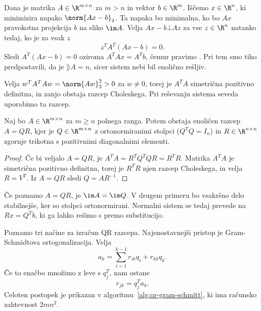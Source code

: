 

Dana je matrika $A \in \R^{m \times n}$ za $m > n$ in vektor $b \in \R^m$.
Iščemo $x \in \R^n$, ki minimizira napako $\norm{Ax-b}_2$.
Ta napaka bo minimalna, ko bo $Ax$ pravokotna projekcija $b$ na sliko $\im A$.
Velja $Ax - b \bot Az$ za vse $z \in \R^n$ natanko tedaj, ko je za vsak $z$
\[
  z^T A^T (Ax - b) = 0.
\]
Sledi $A^T (Ax - b) = 0$ oziroma $A^T A x = A^T b$, čemur pravimo
.
Pri tem smo tiho predpostavili, da je $\rang A = n$, sicer sistem nebi bil
enolično rešljiv.

Velja $w^T A^T A w = \norm{Aw}_2^2 > 0$ za $w \ne 0$, torej je  $A^T A$ simetrična pozitivno definitna, in zanjo obstaja razcep
Choleskega.
Pri reševanju sistema seveda uporabimo ta razcep.



\begin{izrek}
  Naj bo $A \in \R^{m \times n}$ za $m \ge n$ polnega ranga.
  Potem obstaja enoličen razcep $A = QR$, kjer je $Q \in \R^{m \times n}$ z
  ortonormiranimi stolpci ($Q^T Q = I_n$) in $R \in \R^{n \times n}$ zgornje
  trikotna s pozitivnimi diagonalnimi elementi.
\end{izrek}

\begin{proof}
  Če bi veljalo $A = QR$, je $A^T A = R^T Q^T Q R = R^T R$.
  Matrika $A^T A$ je simetrična pozitivno definitna, torej je $R^T R$ njen
  razcep Choleskega, in velja $R = V^T$.
  Iz $A = QR$ sledi $Q = A R^{-1}$.
\end{proof}


Če poznamo $A = QR$, je $\im A = \im Q$.
V drugem primeru bo vsakršno delo stabilnejše, ker so stolpci ortonormirani.
Normalni sistem se tedaj prevede na $Rx = Q^T b$, ki ga lahko rešimo s premo
substitucijo.


Poznamo tri načine za izračun QR razcepa.
Najenostavnejši pristop je Gram-Schmidtova ortogonalizacija.
Velja
\[
  a_k = \sum_{i=1}^{k-1} r_{ik} q_i + r_{kk} q_k.
\]
Če to enačbo množimo z leve s $q_j^T$, nam ostane
\[
  r_{jk} = q_j^T a_k.
\]
Celoten postopek je prikazan v algoritmu~\ref{alg:qr-gram-schmitt}, ki ima
računsko zahtevnost $2 mn^2$.

